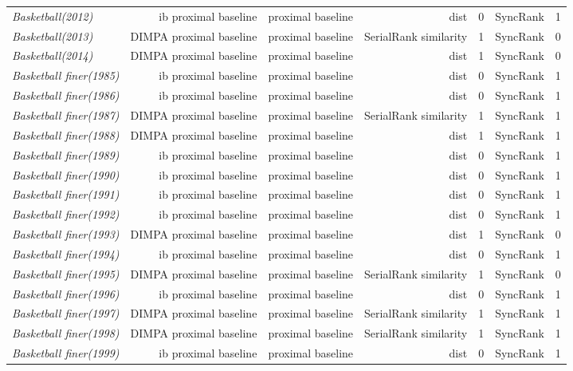 \documentclass[nohyperref]{article}
\theoremstyle{plain}
\theoremstyle{definition}
\theoremstyle{remark}
\begin{document}
\begin{table*}[!ht]
{\begin{tabular}{lrrrrrr}
			{\it Basketball(2012)} & ib proximal baseline & proximal baseline & dist & 0 & SyncRank & 1 \\
			{\it Basketball(2013)} & DIMPA proximal baseline & proximal baseline & SerialRank similarity & 1 & SyncRank & 0 \\
			{\it Basketball(2014)} & DIMPA proximal baseline & proximal baseline & dist & 1 & SyncRank & 0 \\
			{\it Basketball finer(1985)} & ib proximal baseline & proximal baseline & dist & 0 & SyncRank & 1 \\
			{\it Basketball finer(1986)} & ib proximal baseline & proximal baseline & dist & 0 & SyncRank & 1 \\
			{\it Basketball finer(1987)} & DIMPA proximal baseline & proximal baseline & SerialRank similarity & 1 & SyncRank & 1 \\
			{\it Basketball finer(1988)} & DIMPA proximal baseline & proximal baseline & dist & 1 & SyncRank & 1 \\
			{\it Basketball finer(1989)} & ib proximal baseline & proximal baseline & dist & 0 & SyncRank & 1 \\
			{\it Basketball finer(1990)} & ib proximal baseline & proximal baseline & dist & 0 & SyncRank & 1 \\
			{\it Basketball finer(1991)} & ib proximal baseline & proximal baseline & dist & 0 & SyncRank & 1 \\
			{\it Basketball finer(1992)} & ib proximal baseline & proximal baseline & dist & 0 & SyncRank & 1 \\
			{\it Basketball finer(1993)} & DIMPA proximal baseline & proximal baseline & dist & 1 & SyncRank & 0 \\
			{\it Basketball finer(1994)} & ib proximal baseline & proximal baseline & dist & 0 & SyncRank & 1 \\
			{\it Basketball finer(1995)} & DIMPA proximal baseline & proximal baseline & SerialRank similarity & 1 & SyncRank & 0 \\
			{\it Basketball finer(1996)} & ib proximal baseline & proximal baseline & dist & 0 & SyncRank & 1 \\
			{\it Basketball finer(1997)} & DIMPA proximal baseline & proximal baseline & SerialRank similarity & 1 & SyncRank & 1 \\
			{\it Basketball finer(1998)} & DIMPA proximal baseline & proximal baseline & SerialRank similarity & 1 & SyncRank & 1 \\
			{\it Basketball finer(1999)} & ib proximal baseline & proximal baseline & dist & 0 & SyncRank & 1 \\

\end{tabular}}
\end{table*}
\end{document}

